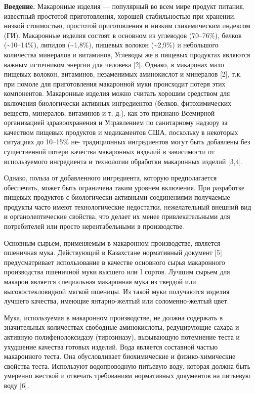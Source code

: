 {\bfseries Введение.} Макаронные изделия --- популярный во всем мире
продукт питания, известный простотой приготовления, хорошей
стабильностью при хранении, низкой стоимостью, простотой приготовления и
низким гликемическим индексом (ГИ). Макаронные изделия состоят в
основном из углеводов (70--76\%), белков (\textasciitilde10--14\%),
липидов (\textasciitilde1,8\%), пищевых волокон (\textasciitilde2,9\%) и
небольшого количества минералов и витаминов, Углеводы же в пищевых
продуктах являются важным источником энергии для человека {[}2{]}.
Однако, в макаронах мало пищевых волокон, витаминов, незаменимых
аминокислот и минералов {[}2{]}, т.к. при помоле для приготовления
макаронной муки происходит потеря этих компонентов. Макаронные изделия
можно считать хорошим средством для включения биологически активных
ингредиентов (белков, фитохимических веществ, минералов, витаминов и т.
д.), как это признано Всемирной организацией здравоохранения и
Управлением по санитарному надзору за качеством пищевых продуктов и
медикаментов США, поскольку в некоторых ситуациях до 10--15\% не-
традиционных ингредиентов могут быть добавлены без существенной потери
качества макаронных изделий в зависимости от используемого ингредиента и
технологии обработки макаронных изделий {[}3,4{]}.

Однако, польза от добавленного ингредиента, которую предполагается
обеспечить, может быть ограничена таким уровнем включения. При
разработке пищевых продуктов с биологически активными соединениями
получаемые продукты часто имеют технологические недостатки,
нежелательный внешний вид и органолептические свойства, что делает их
менее привлекательными для потребителей или просто нерентабельными в
производстве.

Основным сырьем, применяемым в макаронном производстве, является
пшеничная мука. Действующий в Казахстане нормативный документ {[}5{]}
предусматривает использование в качестве основного сырья макаронного
производства пшеничной муки высшего или I сортов. Лучшим сырьем для
макарон является специальная макаронная мука из твердой или
высокостекловидной мягкой пшеницы. Из такой муки получаются изделия
лучшего качества, имеющие янтарно-желтый или соломенно-желтый цвет.

Мука, используемая в макаронном производстве, не должна содержать в
значительных количествах свободные аминокислоты, редуцирующие сахара и
активную полифенолоксидазу (тирозиназу), вызывающую потемнение теста и
ухудшение качества готовых изделий. Вода является составной частью
макаронного теста. Она обусловливает биохимические и физико-химические
свойства теста. Используют водопроводную питьевую воду, которая должна
быть умеренно жесткой и отвечать требованиям нормативных документов на
питьевую воду {[}6{]}.

